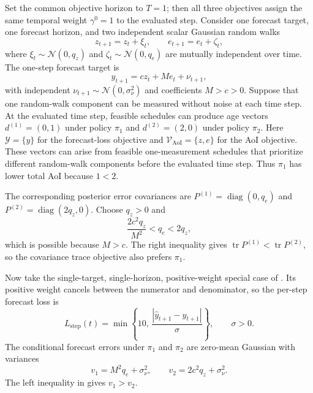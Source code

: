 Set the common objective horizon to $T=1$; then all three objectives assign the
same temporal weight $\gamma^0=1$ to the evaluated step. Consider one forecast
target, one forecast horizon, and two independent scalar
Gaussian random walks
\begin{equation}
  z_{t+1}=z_t+\xi_t,
  \qquad
  e_{t+1}=e_t+\zeta_t,
  \label{eq:proxy_counterexample_state}
\end{equation}
where $\xi_t\sim\mathcal{N}(0,q_z)$ and
$\zeta_t\sim\mathcal{N}(0,q_e)$ are mutually independent over time. The
one-step forecast target is
\begin{equation}
  y_{t+1}=c z_t+M e_t+\nu_{t+1},
  \label{eq:proxy_counterexample_target}
\end{equation}
with independent $\nu_{t+1}\sim\mathcal{N}(0,\sigma_\nu^2)$ and coefficients
$M>c>0$. Suppose that one random-walk component can be measured without noise at
each time step. At the evaluated time step, feasible schedules can produce age vectors
$d^{(1)}=(0,1)$ under policy $\pi_1$ and $d^{(2)}=(2,0)$ under policy $\pi_2$.
Here $\mathcal{Y}=\{y\}$ for the forecast-loss objective and
$\mathcal{V}_{\mathrm{AoI}}=\{z,e\}$ for the AoI objective.
These vectors can arise from feasible one-measurement schedules that prioritize
different random-walk components before the evaluated time step.
Thus $\pi_1$ has lower total AoI because $1<2$.

The corresponding posterior error covariances are
$P^{(1)}=\operatorname{diag}(0,q_e)$ and
$P^{(2)}=\operatorname{diag}(2q_z,0)$. Choose $q_z>0$ and
\begin{equation}
  \frac{2c^2q_z}{M^2}<q_e<2q_z,
  \label{eq:proxy_counterexample_condition}
\end{equation}
which is possible because $M>c$. The right inequality gives
$\operatorname{tr}P^{(1)}<\operatorname{tr}P^{(2)}$, so the covariance trace
objective also prefers $\pi_1$.

Now take the single-target, single-horizon, positive-weight special case of
. Its positive weight cancels between the numerator
and denominator, so the per-step forecast loss is
\begin{equation}
  L_{\mathrm{step}}(t)
  =
  \min\!\left\{10,\,
  \frac{|\widehat y_{t+1}-y_{t+1}|}{\sigma}\right\},
  \qquad \sigma>0.
  \label{eq:proxy_counterexample_step_loss}
\end{equation}
The conditional forecast errors under $\pi_1$ and $\pi_2$ are zero-mean Gaussian
with variances
\begin{equation}
  v_1=M^2q_e+\sigma_\nu^2,
  \qquad
  v_2=2c^2q_z+\sigma_\nu^2.
  \label{eq:proxy_counterexample_error_variances}
\end{equation}
The left inequality in  gives
$v_1>v_2$.

